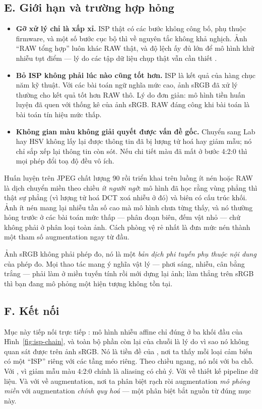 \documentclass[../../../deep_learning.tex]{subfiles}
\begin{document}
\subsection{E. Giới hạn và trường hợp hỏng}
\begin{itemize}
\item \textbf{Gỡ xử lý chỉ là xấp xỉ.} ISP thật có các bước không công bố, phụ thuộc firmware, và một số bước cục bộ thì về nguyên tắc không khả nghịch. Ảnh ``RAW tổng hợp'' luôn khác RAW thật, và độ lệch ấy đủ lớn để mô hình khử nhiễu tụt điểm --- lý do các tập dữ liệu chụp thật vẫn cần thiết \cite{abdelhamed2018sidd}.
\item \textbf{Bỏ ISP không phải lúc nào cũng tốt hơn.} ISP là kết quả của hàng chục năm kỹ thuật. Với các bài toán ngữ nghĩa mức cao, ảnh sRGB đã xử lý thường cho kết quả tốt hơn RAW thô. Lý do đơn giản: mô hình tiền huấn luyện đã quen với thống kê của ảnh sRGB. RAW đáng công khi bài toán là bài toán tín hiệu mức thấp.
\item \textbf{Không gian màu không giải quyết được vấn đề gốc.} Chuyển sang Lab hay HSV không lấy lại được thông tin đã bị lượng tử hoá hay giảm mẫu; nó chỉ sắp xếp lại thông tin còn sót. Nếu chi tiết màu đã mất ở bước 4:2:0 thì mọi phép đổi toạ độ đều vô ích.
\end{itemize}

\begin{cambay}
Huấn luyện trên JPEG chất lượng 90 rồi triển khai trên luồng ít nén hoặc RAW là dịch chuyển miền theo chiều \emph{ít người ngờ}: mô hình đã học rằng vùng phẳng thì thật sự phẳng (vì lượng tử hoá DCT xoá nhiễu ở đó) và biên có cấu trúc khối. Ảnh ít nén mang lại nhiễu tần số cao mà mô hình chưa từng thấy, và nó thường hỏng trước ở các bài toán mức thấp --- phân đoạn biên, đếm vật nhỏ --- chứ không phải ở phân loại toàn ảnh. Cách phòng vệ rẻ nhất là đưa mức nén thành một tham số augmentation ngay từ đầu.
\end{cambay}

\begin{cannho}
Ảnh sRGB không phải phép đo, nó là một \emph{bản dịch phi tuyến phụ thuộc nội dung} của phép đo. Mọi thao tác mang ý nghĩa vật lý --- phơi sáng, nhiễu, cân bằng trắng --- phải làm ở miền tuyến tính rồi mới dựng lại ảnh; làm thẳng trên sRGB thì bạn đang mô phỏng một hiện tượng không tồn tại. 
\end{cannho}

\subsection{F. Kết nối}
Mục này tiếp nối trực tiếp : mô hình nhiễu affine chỉ đúng ở ba khối đầu của Hình~\ref{fig:isp-chain}, và toàn bộ phần còn lại của chuỗi là lý do vì sao nó không quan sát được trên ảnh sRGB. Nó là tiền đề của , nơi ta thấy mỗi loại cảm biến có một ``ISP'' riêng với các tầng méo riêng. Theo chiều ngang, nó nối với ba chỗ. Với , vì giảm mẫu màu 4:2:0 chính là aliasing có chủ ý. Với  về thiết kế pipeline dữ liệu. Và với  về augmentation, nơi ta phân biệt rạch ròi augmentation \emph{mô phỏng miền} với augmentation \emph{chính quy hoá} --- một phân biệt bắt nguồn từ đúng mục này.
\end{document}
